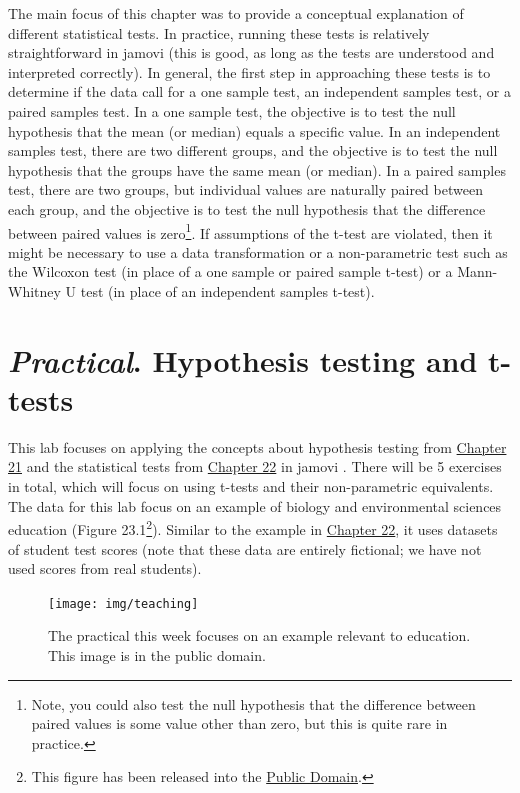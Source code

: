 \documentclass[
]{scrbook}
\begin{document}
The main focus of this chapter was to provide a conceptual explanation of different statistical tests.
In practice, running these tests is relatively straightforward in jamovi (this is good, as long as the tests are understood and interpreted correctly).
In general, the first step in approaching these tests is to determine if the data call for a one sample test, an independent samples test, or a paired samples test.
In a one sample test, the objective is to test the null hypothesis that the mean (or median) equals a specific value.
In an independent samples test, there are two different groups, and the objective is to test the null hypothesis that the groups have the same mean (or median).
In a paired samples test, there are two groups, but individual values are naturally paired between each group, and the objective is to test the null hypothesis that the difference between paired values is zero\footnote{Note, you could also test the null hypothesis that the difference between paired values is some value other than zero, but this is quite rare in practice.}.
If assumptions of the t-test are violated, then it might be necessary to use a data transformation or a non-parametric test such as the Wilcoxon test (in place of a one sample or paired sample t-test) or a Mann-Whitney U test (in place of an independent samples t-test).

\hypertarget{Chapter_23}{%
\chapter{\texorpdfstring{\emph{Practical}. Hypothesis testing and t-tests}{Practical. Hypothesis testing and t-tests}}\label{Chapter_23}}

This lab focuses on applying the concepts about hypothesis testing from \protect\hyperlink{Chapter_21}{Chapter 21} and the statistical tests from \protect\hyperlink{Chapter_22}{Chapter 22} in jamovi \citep{Jamovi2022}.
There will be 5 exercises in total, which will focus on using t-tests and their non-parametric equivalents.
The data for this lab focus on an example of biology and environmental sciences education (Figure 23.1\footnote{This figure has been released into the \href{https://commons.wikimedia.org/wiki/File:Teach_in_pine_needles.jpg}{Public Domain}.}).
Similar to the example in \protect\hyperlink{Chapter_22}{Chapter 22}, it uses datasets of student test scores (note that these data are entirely fictional; we have not used scores from real students).

\begin{figure}
\texttt{[image: img/teaching]} \caption{The practical this week focuses on an example relevant to education. This image is in the public domain.}\label{fig:unnamed-chunk-98}
\end{figure}
\end{document}
